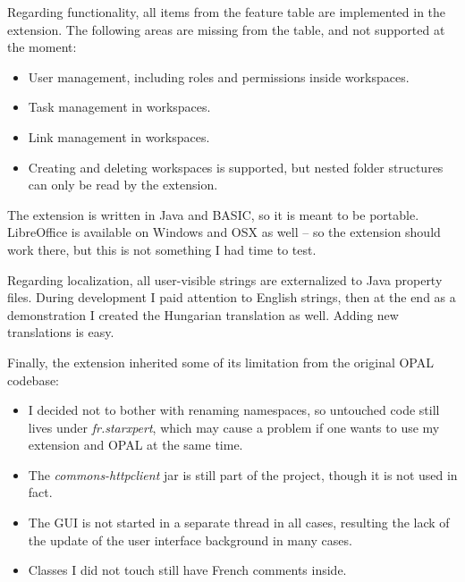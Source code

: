 Regarding functionality, all items from the feature table are implemented in
the extension. The following areas are missing from the table, and not
supported at the moment:

\begin{itemize}
\item User management, including roles and permissions inside workspaces.
\item Task management in workspaces.
\item Link management in workspaces.
\item Creating and deleting workspaces is supported, but nested folder
structures can only be read by the extension.
\end{itemize}

The extension is written in Java and BASIC, so it is meant to be portable.
LibreOffice is available on Windows and OSX as well -- so the extension should
work there, but this is not something I had time to test.

Regarding localization, all user-visible strings are externalized to Java
property files. During development I paid attention to English strings, then at
the end as a demonstration I created the Hungarian translation as well. Adding
new translations is easy.

Finally, the extension inherited some of its limitation from the original OPAL
codebase:

\begin{itemize}
\item I decided not to bother with renaming namespaces, so untouched code still
lives under \emph{fr.starxpert}, which may cause a problem if one wants to use
my extension and OPAL at the same time.
\item The \emph{commons-httpclient} jar is still part of the project, though it is not used in fact.
\item The GUI is not started in a separate thread in all cases, resulting the
lack of the update of the user interface background in many cases.
\item Classes I did not touch still have French comments inside.
\end{itemize}
